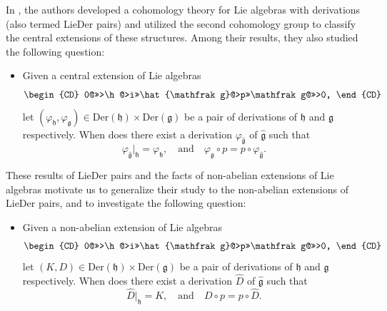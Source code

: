 \documentclass[12pt]{amsart}
\newcommand{\g}{\mathfrak g}
\newcommand{\h}{\mathfrak h}
\newcommand{\LD}{{\rm LieDer }}
\newcommand{\Der}{\mathrm{Der}}
\begin{document}
In \cite{TFS}, the authors developed a cohomology theory for Lie algebras with derivations (also termed \LD pairs) and utilized the second cohomology group to classify the central extensions of these structures. Among their results, they also studied the following question:
\begin{itemize}
    \item
Given a central extension of Lie algebras
\[\begin{CD}
0@>>>\h@>i>>\hat{\g}@>p>>\g            @>>>0,
\end{CD}\]
let $(\varphi_\h,\varphi_\g)\in\Der(\h)\times\Der(\g)$ be a pair of derivations of $\h$ and $\g$ respectively. When does there exist a derivation $\varphi_{\hat{\g}}$ of $\hat{\g}$ such that $$\varphi_{\hat{\g}}|_\h=\varphi_\h, \quad \text{and}\quad  \varphi_\g\circ p=p\circ\varphi_{\hat{\g}}.$$ 
\end{itemize}
These results of \LD pairs and the facts of non-abelian extensions of Lie algebras motivate us to generalize their study to the non-abelian extensions of \LD pairs, and to investigate the following question:
\begin{itemize}
    \item
Given a non-abelian extension of Lie algebras
\[\begin{CD}
0@>>>\h@>i>>\hat{\g}@>p>>\g            @>>>0,
\end{CD}\]
let $(K,D)\in\Der(\h)\times\Der(\g)$ be a pair of derivations of $\h$ and $\g$ respectively. When does there exist a derivation $\hat{D}$ of $\hat{\g}$ such that $$\hat{D}|_\h=K, \quad \text{and}\quad  D\circ p=p\circ\hat{D}.$$ 
\end{itemize}
\end{document}

